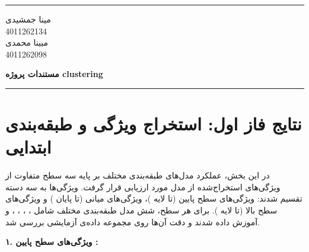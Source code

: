 \documentclass[a4paper,12pt]{article}
\newcommand{\StudentOne}{4011262134}
\newcommand{\StudentTwo}{4011262098}
\newcommand{\NameOne}{مینا جمشیدی}
\newcommand{\NameTwo}{مبینا محمدی}
\newcommand{\ProjectName}{مستندات پروژه clustering}
\let\nobreaksection\section
\renewcommand{\section}{\nobreaksection}
\begin{document}
	

	\hrule \medskip
	\begin{minipage}{0.3\textwidth}
		\raggedright
		\small
		\NameOne \\
		\StudentOne \\
		\NameTwo \\
		\StudentTwo
	\end{minipage}
	\begin{minipage}{0.4\textwidth} 
		\centering 
		\large\bfseries
		\ProjectName \\
	\end{minipage}
	\begin{minipage}{0.3\textwidth}
		\raggedleft
		\small
	\end{minipage}
	\medskip\hrule 
	\vspace*{1.5cm}  
	
\section{نتایج فاز اول: استخراج ویژگی و طبقه‌بندی ابتدایی}


در این بخش، عملکرد مدل‌های طبقه‌بندی مختلف بر پایه سه سطح متفاوت از ویژگی‌های استخراج‌شده از مدل  مورد ارزیابی قرار گرفت. ویژگی‌ها به سه دسته تقسیم شدند: ویژگی‌های سطح پایین (تا لایه )، ویژگی‌های میانی (تا پایان ) و ویژگی‌های سطح بالا (تا لایه ). برای هر سطح، شش مدل طبقه‌بندی مختلف شامل ، ، ، ،  و  آموزش داده شدند و دقت آن‌ها روی مجموعه داده‌ی آزمایشی بررسی شد.

\vspace{0.5cm}
\textbf{۱. ویژگی‌های سطح پایین :}
\end{document}

